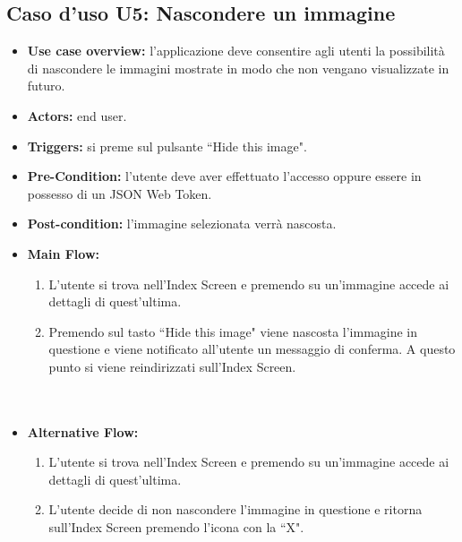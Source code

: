 \subsection*{Caso d'uso U5: Nascondere un immagine}
\begin{itemize}
    \item  \textbf{Use case overview:} l'applicazione deve consentire agli utenti la possibilit\`a di nascondere le immagini mostrate in modo che non vengano visualizzate in futuro.
    \item \textbf{Actors:} end user.
    \item \textbf{Triggers:} si preme sul pulsante ``Hide this image".
    \item \textbf{Pre-Condition:} l'utente deve aver effettuato l'accesso oppure essere in possesso di un JSON Web Token.
    \item \textbf{Post-condition:} l'immagine selezionata verr\`a nascosta.
    \item \textbf{Main Flow:} \begin{enumerate}
              \item L'utente si trova nell'Index Screen e premendo su un'immagine accede ai dettagli di quest'ultima.
              \item Premendo sul tasto ``Hide this image" viene nascosta l'immagine in questione e viene notificato all'utente un messaggio di conferma. A questo punto si viene reindirizzati sull'Index Screen.\\ \\ \\

          \end{enumerate}
    \item \textbf{Alternative Flow:}\begin{enumerate}
              \item L'utente si trova nell'Index Screen e premendo su un'immagine accede ai dettagli di quest'ultima.
              \item L'utente decide di non nascondere l'immagine in questione e ritorna sull'Index Screen premendo l'icona con la ``X".

          \end{enumerate}
\end{itemize}

